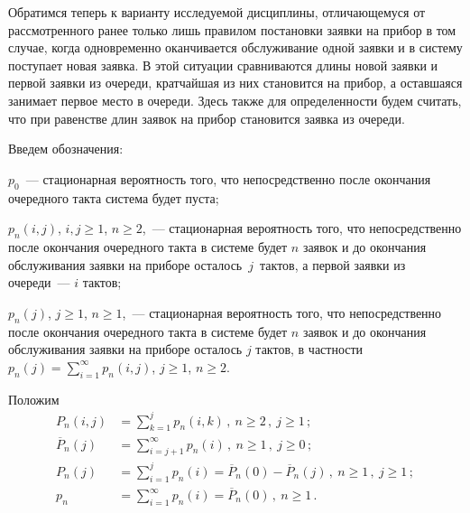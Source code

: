 \begin{multicols}{2}

Обратимся теперь к варианту исследуемой дисциплины,
отличающемуся от рассмотренного ранее только лишь
правилом постановки заявки на прибор в том случае,
когда одновременно оканчивается обслуживание одной
заявки и в систему поступает новая заявка.
В этой ситуации сравниваются длины новой заявки и
первой заявки из очереди, кратчайшая из них
становится на прибор, а оставшаяся занимает первое
место в очереди.
Здесь также для
 определенности будем считать, что
при равенстве длин заявок на прибор становится
заявка из оче\-реди.

Введем обозначения:

$p_{0}$~--- стационарная вероятность того, что непосредственно
после окончания очередного такта система будет пуста;

$p_{n}(i,j)$, $i,j\ge 1$, $n\ge 2$,~--- стационарная
вероятность того, что непосредственно после окончания
очередного такта в системе будет $n$ заявок и до окончания
обслуживания заявки на приборе осталось~$j$~тактов, а первой
заявки из очереди~--- $i$ тактов;

$p_{n}(j)$, $j\ge 1$, $n\ge 1$,~--- стационарная
вероятность того, что непосредственно после окончания
очередного такта в системе будет $n$ заявок и до окончания
обслуживания заявки на приборе осталось $j$ тактов,
в частности
$p_{n}(j) = \sum\limits_{i=1}^\infty p_{n}(i,j)$,
$j\ge 1$, $n\ge 2$.

Положим
\begin{align*}
P_{n}(i,j) &= \sum\limits_{k=1}^j
p_{n}(i,k)\,,  \ n\ge 2\,,\  j\ge 1\,;\\[2pt]
\overline P_{n}(j) &=  \sum\limits_{i=j+1}^\infty p_{n}(i)\,,
\  n\ge 1\,,\  j\ge 0\,;\\[2pt]
P_{n}(j) & =  \sum\limits_{i=1}^j
p_{n}(i) = \overline P_{n}(0) - \overline P_{n}(j)\,,
\  n\ge 1\,,\  j\ge 1\,;\\[2pt]
p_{n} & = \sum\limits_{i=1}^\infty
p_{n}(i)  = \overline P_{n}(0)\,,
 \ n\ge 1\,.
\end{align*}


\end{multicols}
